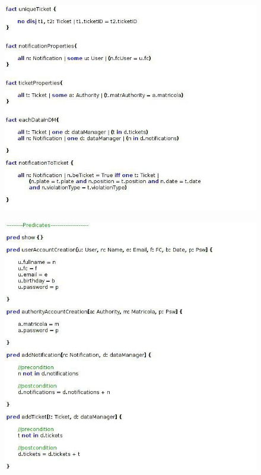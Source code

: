 \documentclass {article}
\begin{document}
		\begin{figure}[H]
			\centering
			\includegraphics[scale=0.75]{Images/Alloy/alloy_3.jpg}
		\end{figure}
		\begin{figure}[H]
			\centering
			\includegraphics[scale=0.75]{Images/Alloy/alloy_4.jpg}
		\end{figure}
\end{document}
